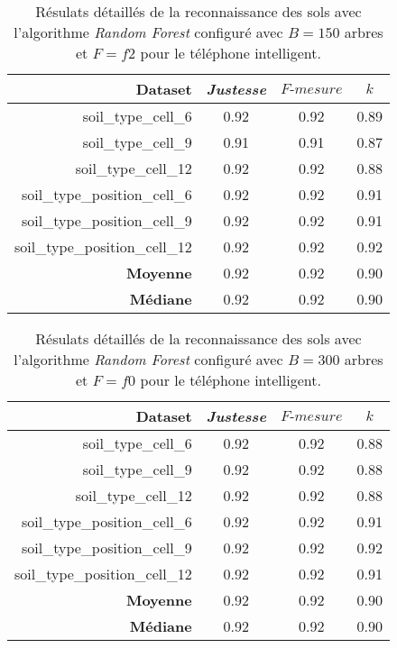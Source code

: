 \begin{table}[H]\renewcommand{\arraystretch}{0.5}
	\centering
	\caption{Résulats détaillés de la reconnaissance des sols avec l'algorithme \textit{Random Forest} configuré avec $B=150$ arbres et $F=f2$ pour le téléphone intelligent.}
	\label{tab:rf-150-f2-cell}
	\begin{tabular}{@{}rccc@{}}
		\toprule
			\textbf{Dataset} & \textit{Justesse} & $F\mbox{-} mesure$ & \textbf{$k$} \\
		\midrule
			soil\_type\_cell\_6 & 0.92 & 0.92 & 0.89 \\
			soil\_type\_cell\_9 & 0.91 & 0.91 & 0.87 \\
			soil\_type\_cell\_12 & 0.92 & 0.92 & 0.88 \\
			soil\_type\_position\_cell\_6 & 0.92 & 0.92 & 0.91 \\
			soil\_type\_position\_cell\_9 & 0.92 & 0.92 & 0.91 \\
			soil\_type\_position\_cell\_12 & 0.92 & 0.92 & 0.92 \\
			\textbf{Moyenne} & 0.92 & 0.92 & 0.90 \\
			\textbf{Médiane} & 0.92 & 0.92 & 0.90 \\
		\bottomrule
	\end{tabular}
\end{table}

\begin{table}[H]\renewcommand{\arraystretch}{0.5}
	\centering
	\caption{Résulats détaillés de la reconnaissance des sols avec l'algorithme \textit{Random Forest} configuré avec $B=300$ arbres et $F=f0$ pour le téléphone intelligent.}
	\label{tab:rf-300-f0-cell}
	\begin{tabular}{@{}rccc@{}}
		\toprule
			\textbf{Dataset} & \textit{Justesse} & $F\mbox{-} mesure$ & \textbf{$k$} \\
		\midrule
			soil\_type\_cell\_6 & 0.92 & 0.92 & 0.88 \\
			soil\_type\_cell\_9 & 0.92 & 0.92 & 0.88 \\
			soil\_type\_cell\_12 & 0.92 & 0.92 & 0.88 \\
			soil\_type\_position\_cell\_6 & 0.92 & 0.92 & 0.91 \\
			soil\_type\_position\_cell\_9 & 0.92 & 0.92 & 0.92 \\
			soil\_type\_position\_cell\_12 & 0.92 & 0.92 & 0.91 \\
			\textbf{Moyenne} & 0.92 & 0.92 & 0.90 \\
			\textbf{Médiane} & 0.92 & 0.92 & 0.90 \\
		\bottomrule
	\end{tabular}
\end{table}

